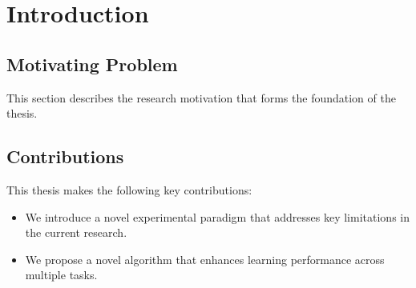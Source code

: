 \chapter{Introduction}
\label{chapter1}

\section{Motivating Problem}
\label{ch1:sec:motivation}
\begin{paragraph}
This section describes the research motivation that forms the foundation of the thesis.
\end{paragraph}

\section{Contributions}
\label{ch1:sec:Contributions}
\begin{paragraph}
This thesis makes the following key contributions:
\end{paragraph}

\begin{itemize}[leftmargin=\paritemindent]
    \item We introduce a novel experimental paradigm that addresses key limitations in the current research.
    \item We propose a novel algorithm that enhances learning performance across multiple tasks.
\end{itemize}

